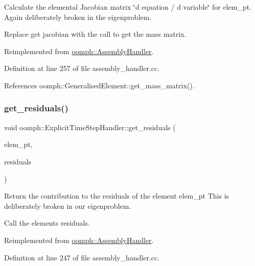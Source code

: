Calculate the elemental Jacobian matrix \char`\"{}d equation 
/ d variable\char`\"{} for elem\+\_\+pt. Again deliberately broken in the eigenproblem. 

Replace get jacobian with the call to get the mass matrix. 

Reimplemented from \hyperlink{classoomph_1_1AssemblyHandler_ad43c3d8760be0ba6ebee8d82509458e5}{oomph\+::\+Assembly\+Handler}.



Definition at line 257 of file assembly\+\_\+handler.\+cc.



References oomph\+::\+Generalised\+Element\+::get\+\_\+mass\+\_\+matrix().

\mbox{\label{classoomph_1_1ExplicitTimeStepHandler_aef8ab1b61aef072b2bcb061dd287a00f}} 
\subsubsection{\texorpdfstring{get\+\_\+residuals()}{get\_residuals()}}
{\footnotesize\ttfamily void oomph\+::\+Explicit\+Time\+Step\+Handler\+::get\+\_\+residuals (\begin{DoxyParamCaption}\item[{\hyperlink{classoomph_1_1GeneralisedElement}{Generalised\+Element} $\ast$const \&}]{elem\+\_\+pt,  }\item[{\hyperlink{classoomph_1_1Vector}{Vector}$<$ double $>$ \&}]{residuals }\end{DoxyParamCaption})\hspace{0.3cm}{\ttfamily [virtual]}}



Return the contribution to the residuals of the element elem\+\_\+pt This is deliberately broken in our eigenproblem. 

Call the element\textquotesingle{}s residuals. 

Reimplemented from \hyperlink{classoomph_1_1AssemblyHandler_a7a6203b0ab90da62b4da2af8a26d08b3}{oomph\+::\+Assembly\+Handler}.



Definition at line 247 of file assembly\+\_\+handler.\+cc.



